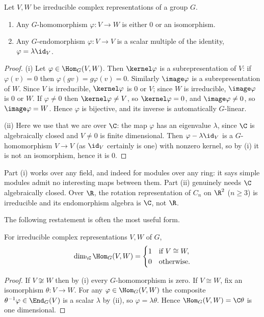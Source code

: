 \begin{theorem}
	Let $V, W$ be irreducible complex representations of a group $G$.
	\begin{enumerate}[label=(\roman*)]
		\item Any $G$-homomorphism $\varphi: V \to W$ is either $0$ or an isomorphism.
		\item Any $G$-endomorphism $\varphi : V \to V$ is a scalar multiple of the identity, $\varphi = \lambda \id_V$.
	\end{enumerate}
\end{theorem}
\begin{proof}
	(i) Let $\varphi \in \Hom_G(V,W)$. Then $\kernel\varphi$ is a subrepresentation of $V$: if $\varphi(v) = 0$ then $\varphi(gv) = g\varphi(v) = 0$. Similarly $\image \varphi$ is a subrepresentation of $W$. Since $V$ is irreducible, $\kernel \varphi$ is $0$ or $V$; since $W$ is irreducible, $\image \varphi$ is $0$ or $W$. If $\varphi \neq 0$ then $\kernel \varphi \neq V$, so $\kernel \varphi = 0$, and $\image \varphi \neq 0$, so $\image \varphi = W$. Hence $\varphi$ is bijective, and its inverse is automatically $G$-linear.

	(ii) Here we use that we are over $\C$: the map $\varphi$ has an eigenvalue $\lambda$, since $\C$ is algebraically closed and $V \neq 0$ is finite dimensional. Then $\varphi - \lambda\id_V$ is a $G$-homomorphism $V \to V$ (as $\id_V$ certainly is one) with nonzero kernel, so by (i) it is not an isomorphism, hence it is $0$.
\end{proof}

\begin{remark}
	Part (i) works over any field, and indeed for modules over any ring: it says simple modules admit no interesting maps between them. Part (ii) genuinely needs $\C$ algebraically closed. Over $\R$, the rotation representation of $C_n$ on $\R^2$ ($n \geq 3$) is irreducible and its endomorphism algebra is $\C$, not $\R$.
\end{remark}

The following restatement is often the most useful form.

\begin{corollary}
	For irreducible complex representations $V, W$ of $G$,
	$$\dim_\C \Hom_G(V,W) = \begin{cases} 1 & \text{if } V \cong W, \\ 0 & \text{otherwise.}\end{cases}$$
\end{corollary}
\begin{proof}
	If $V \not\cong W$ then by (i) every $G$-homomorphism is zero. If $V \cong W$, fix an isomorphism $\theta : V \to W$. For any $\varphi \in \Hom_G(V,W)$ the composite $\theta^{-1}\varphi \in \End_G(V)$ is a scalar $\lambda$ by (ii), so $\varphi = \lambda \theta$. Hence $\Hom_G(V,W) = \C\theta$ is one dimensional.
\end{proof}

